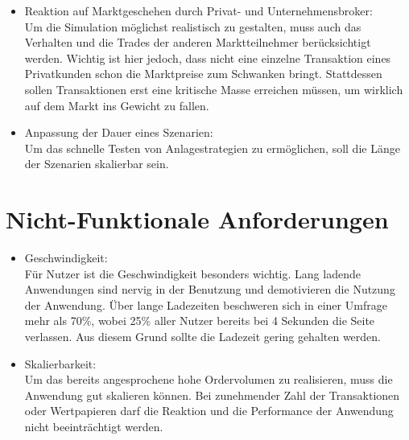 \begin{itemize}
		\item Reaktion auf Marktgeschehen durch Privat- und Unternehmensbroker: \\
			Um die Simulation möglichst realistisch zu gestalten, muss auch das Verhalten und die Trades der anderen Marktteilnehmer berücksichtigt werden. Wichtig ist hier jedoch, dass nicht eine einzelne Transaktion eines Privatkunden schon die Marktpreise zum Schwanken bringt.
			Stattdessen sollen Transaktionen erst eine kritische Masse erreichen müssen, um wirklich auf dem Markt ins Gewicht zu fallen. 
			
		\item Anpassung der Dauer eines Szenarien: \\
			Um das schnelle Testen von Anlagestrategien zu ermöglichen, soll die Länge der Szenarien skalierbar sein.
	\end{itemize}
	
\section{Nicht-Funktionale Anforderungen}
		\begin{itemize}
		\item Geschwindigkeit: \\
			Für Nutzer ist die Geschwindigkeit besonders wichtig. Lang ladende Anwendungen sind nervig in der Benutzung und demotivieren die Nutzung der Anwendung. Über lange Ladezeiten beschweren sich in einer Umfrage mehr als 70\%, wobei 25\% aller Nutzer bereits bei 4 Sekunden die Seite verlassen. Aus diesem Grund sollte die Ladezeit gering gehalten werden.
			
		\item Skalierbarkeit: \\
			Um das bereits angesprochene hohe Ordervolumen zu realisieren, muss die Anwendung gut skalieren können.
			Bei zunehmender Zahl der Transaktionen oder Wertpapieren darf die Reaktion und die Performance der Anwendung nicht beeinträchtigt werden. 
	\end{itemize}

